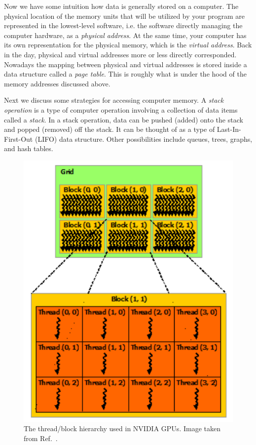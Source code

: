 Now we have some intuition how data is generally stored on a computer.
The physical location of the memory units that will be utilized by your
program are represented in the lowest-level software, i.e. the software
directly managing the computer hardware, as a {\it physical address}.
At the same time, your computer has its own representation for the physical
memory, which is the {\it virtual address}.
Back in the day, physical and virtual addresses more or less directly corresponded.
Nowadays the mapping between physical and virtual addresses is stored inside a
data structure called a {\it page table}.
This is roughly what is under the hood of the memory
addresses discussed above.

Next we discuss some strategies for accessing computer memory.
A {\it stack operation} is a type of computer operation involving a 
collection of data items called a {\it stack}. In a stack operation, data can be 
pushed (added) onto the stack and popped (removed) off the stack. It can be thought 
of as a type of Last-In-First-Out (LIFO) data structure.
Other possibilities include queues, trees, graphs, and hash tables.


\begin{figure}
\includegraphics[width=\linewidth]{figs/threadBlock.pdf}
\caption{The thread/block hierarchy used in NVIDIA GPUs.
Image taken from Ref.~\cite{NVIDIA}.}
\label{fig:threadBlock}
\end{figure}


